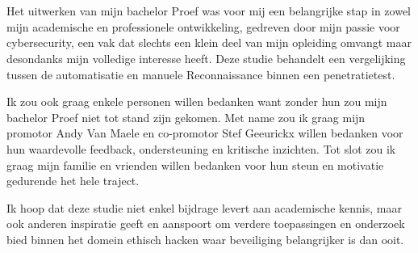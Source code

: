 
\chapter*{}%
\label{ch:voorwoord}


Het uitwerken van mijn bachelor Proef was voor mij een belangrijke stap in zowel mijn academische en professionele ontwikkeling, gedreven door mijn passie voor cybersecurity, een vak dat slechts een klein deel van mijn opleiding omvangt maar desondanks mijn volledige interesse heeft.
Deze studie behandelt een vergelijking tussen de automatisatie en manuele Reconnaissance binnen een penetratietest.

Ik zou ook graag enkele personen willen bedanken want zonder hun zou mijn bachelor Proef niet tot stand zijn gekomen.
Met name zou ik graag mijn promotor Andy Van Maele en co-promotor Stef Geeurickx willen bedanken voor hun waardevolle feedback, ondersteuning en kritische inzichten.
Tot slot zou ik graag mijn familie en vrienden willen bedanken voor hun steun en motivatie gedurende het hele traject.

Ik hoop dat deze studie niet enkel bijdrage levert aan academische kennis, maar ook anderen inspiratie geeft en aanspoort om verdere toepassingen en onderzoek bied binnen het domein ethisch hacken waar beveiliging belangrijker is dan ooit.

